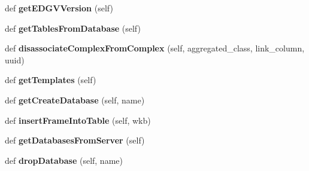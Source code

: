 \begin{DoxyCompactItemize}
def {\bfseries get\+E\+D\+G\+V\+Version} (self)
\item 
\mbox{\label{class_dsg_tools_1_1_factories_1_1_sql_factory_1_1sql_generator_1_1_sql_generator_aa659256976c4eaabec25c3719ada0d2e}} 
def {\bfseries get\+Tables\+From\+Database} (self)
\item 
\mbox{\label{class_dsg_tools_1_1_factories_1_1_sql_factory_1_1sql_generator_1_1_sql_generator_a14bd17da798fc386d796cb08f954cf09}} 
def {\bfseries disassociate\+Complex\+From\+Complex} (self, aggregated\+\_\+class, link\+\_\+column, uuid)
\item 
\mbox{\label{class_dsg_tools_1_1_factories_1_1_sql_factory_1_1sql_generator_1_1_sql_generator_adf9161146c96bd07a583c14659995bb7}} 
def {\bfseries get\+Templates} (self)
\item 
\mbox{\label{class_dsg_tools_1_1_factories_1_1_sql_factory_1_1sql_generator_1_1_sql_generator_a9add6f4c5f4246d4966d564c4b485792}} 
def {\bfseries get\+Create\+Database} (self, name)
\item 
\mbox{\label{class_dsg_tools_1_1_factories_1_1_sql_factory_1_1sql_generator_1_1_sql_generator_a2eeccea422afccab8ba652b66ab98c98}} 
def {\bfseries insert\+Frame\+Into\+Table} (self, wkb)
\item 
\mbox{\label{class_dsg_tools_1_1_factories_1_1_sql_factory_1_1sql_generator_1_1_sql_generator_a3f6eb52554b016199a8a411e5c431e03}} 
def {\bfseries get\+Databases\+From\+Server} (self)
\item 
\mbox{\label{class_dsg_tools_1_1_factories_1_1_sql_factory_1_1sql_generator_1_1_sql_generator_abd11661115a5399eb14dd4db15557d0a}} 
def {\bfseries drop\+Database} (self, name)
\item 

\end{DoxyCompactItemize}
